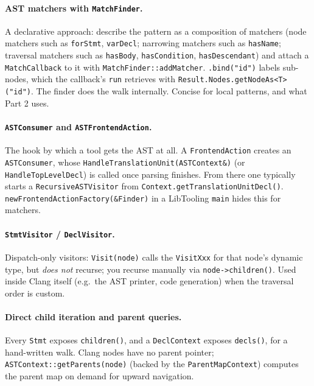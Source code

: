 \documentclass[11pt,a4paper]{article}
\begin{document}
\paragraph{AST matchers with \texttt{MatchFinder}.}
A declarative approach: describe the pattern as a composition of matchers (node matchers such as \texttt{forStmt}, \texttt{varDecl}; narrowing matchers such as \texttt{hasName}; traversal matchers such as \texttt{hasBody}, \texttt{hasCondition}, \texttt{hasDescendant}) and attach a \texttt{MatchCallback} to it with \texttt{MatchFinder::addMatcher}. \texttt{.bind("id")} labels sub-nodes, which the callback's \texttt{run} retrieves with \texttt{Result.Nodes.getNodeAs<T>("id")}. The finder does the walk internally. Concise for local patterns, and what Part 2 uses.

\paragraph{\texttt{ASTConsumer} and \texttt{ASTFrontendAction}.}
The hook by which a tool gets the AST at all. A \texttt{FrontendAction} creates an \texttt{ASTConsumer}, whose \texttt{HandleTranslationUnit(ASTContext\&)} (or \texttt{HandleTopLevelDecl}) is called once parsing finishes. From there one typically starts a \texttt{RecursiveASTVisitor} from \texttt{Context.getTranslationUnitDecl()}. \texttt{newFrontendActionFactory(\&Finder)} in a LibTooling \texttt{main} hides this for matchers.

\paragraph{\texttt{StmtVisitor} / \texttt{DeclVisitor}.}
Dispatch-only visitors: \texttt{Visit(node)} calls the \texttt{VisitXxx} for that node's dynamic type, but \emph{does not} recurse; you recurse manually via \texttt{node->children()}. Used inside Clang itself (e.g.\ the AST printer, code generation) when the traversal order is custom.

\paragraph{Direct child iteration and parent queries.}
Every \texttt{Stmt} exposes \texttt{children()}, and a \texttt{DeclContext} exposes \texttt{decls()}, for a hand-written walk. Clang nodes have no parent pointer; \texttt{ASTContext::getParents(node)} (backed by the \texttt{ParentMapContext}) computes the parent map on demand for upward navigation.
\end{document}
